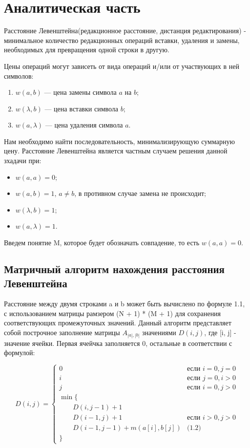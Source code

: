 \chapter{Аналитическая часть}

Расстояние Левенштейна(редакционное расстояние, дистанция редактирования) - минимальное количество редакционных операций вставки, 
удаления и замены, необходимых для превращения одной строки в другую.

Цены операций могут зависеть от вида операций и/или от участвующих в ней символов:
\begin{enumerate}[label=\arabic*)]
	\item $w(a, b)$ --- цена замены символа $a$ на $b$;
	\item $w(\lambda, b)$ --- цена вставки символа $b$;
	\item $w(a, \lambda)$ --- цена удаления символа $a$.
\end{enumerate}

Нам необходимо найти последовательность, минимализирующую суммарную цену. Расстояние Левенштейна 
является частным случаем решения данной зхадачи при:
\begin{itemize}[label=---]
    \item $w(a, a) = 0$;
	\item $w(a, b) = 1$, $a \neq b$, в противном случае замена не происходит;
	\item $w(\lambda, b) = 1$;
	\item $w(a, \lambda) = 1$.
\end{itemize}

Введем понятие M, которое будет обозначать совпадение, то есть $w(a, a) = 0$.

\section{Матричный алгоритм нахождения расстояния Левенштейна}

Расстояние между двумя строками a и b может быть вычислено по формуле 1.1, 
с использованием матрицы рамзером (N + 1) * (M + 1) для сохранения соответствующих промежуточных значений. Данный
алгоритм представляет собой построчное заполнение матрицы $A_{|a|,|b|}$ значениями $D(i, j)$, где 
[i, j] - значение ячейки. Первая ячейчка заполняется 0, остальные в соответствии с формулой:


\begin{equation}
    \label{eq:D}
    D(i, j) = \begin{cases}
        0 & \text{если } i = 0, j = 0\\
        i & \text{если } j = 0, i > 0\\
        j & \text{если } i = 0, j > 0\\
        \min \lbrace \\
        \qquad D(i, j-1) + 1\\
        \qquad D(i-1, j) + 1 & \text{если } i > 0, j > 0\\
        \qquad D(i-1, j-1) + m(a[i], b[j]) & \text{(1.2)}\\
        \rbrace
    \end{cases}
\end{equation}

